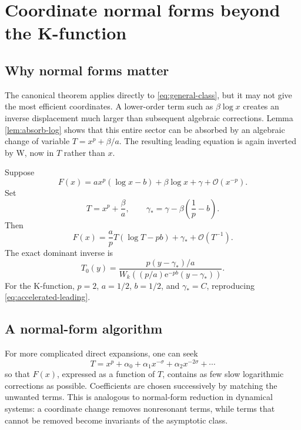 \documentclass[11pt,a4paper]{article}
\numberwithin{equation}{section}
\theoremstyle{remark}
\newcommand{\e}{\mathrm e}
\newcommand{\bigO}{\mathcal O}
\begin{document}
\section{Coordinate normal forms beyond the K-function}
\label{sec:normal-forms-general}

\subsection{Why normal forms matter}

The canonical theorem applies directly to \cref{eq:general-class}, but it may
not give the most efficient coordinates.  A lower-order term such as
\(\beta\log x\) creates an inverse displacement much larger than subsequent
algebraic corrections.  Lemma \ref{lem:absorb-log} shows that this entire
sector can be absorbed by an algebraic change of variable
\(T=x^p+\beta/a\).  The resulting leading equation is again inverted by W,
now in \(T\) rather than \(x\).

Suppose
\begin{equation}
F(x)=a x^p(\log x-b)+\beta\log x+\gamma+\bigO(x^{-p}).
\label{eq:normal-form-input}
\end{equation}
Set
\begin{equation}
T=x^p+\frac{\beta}{a},
\qquad
\gamma_*=\gamma-\beta\left(\frac1p-b\right).
\label{eq:normal-form-T-gamma}
\end{equation}
Then
\begin{equation}
F(x)=\frac{a}{p}T(\log T-pb)+\gamma_*+\bigO(T^{-1}).
\label{eq:normal-form-output}
\end{equation}
The exact dominant inverse is
\begin{equation}
T_0(y)=
\frac{p(y-\gamma_*)/a}
{W_k\!\left((p/a)\e^{-pb}(y-\gamma_*)\right)}.
\label{eq:normal-form-inverse}
\end{equation}
For the K-function, \(p=2\), \(a=1/2\), \(b=1/2\), and
\(\gamma_*=C\), reproducing \cref{eq:accelerated-leading}.

\subsection{A normal-form algorithm}

For more complicated direct expansions, one can seek
\begin{equation}
T=x^p+\alpha_0+\alpha_1x^{-\sigma}+\alpha_2x^{-2\sigma}+\cdots
\label{eq:formal-coordinate}
\end{equation}
so that \(F(x)\), expressed as a function of \(T\), contains as few slow
logarithmic corrections as possible.  Coefficients are chosen successively
by matching the unwanted terms.  This is analogous to normal-form reduction
in dynamical systems: a coordinate change removes nonresonant terms, while
terms that cannot be removed become invariants of the asymptotic class.
\end{document}
